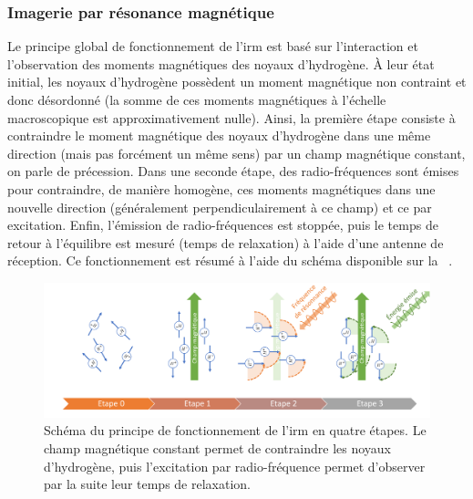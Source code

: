 \subsubsection{Imagerie par résonance magnétique}
Le principe global de fonctionnement de l'\gls{irm} est basé sur l'interaction et l'observation des moments magnétiques des noyaux d'hydrogène. À leur état initial, les noyaux d'hydrogène possèdent un moment magnétique non contraint et donc désordonné (la somme de ces moments magnétiques à l'échelle macroscopique est approximativement nulle). Ainsi, la première étape consiste à contraindre le moment magnétique des noyaux d'hydrogène dans une même direction (mais pas forcément un même sens) par un champ magnétique constant, on parle de précession. Dans une seconde étape, des radio-fréquences sont émises pour contraindre, de manière homogène, ces moments magnétiques dans une nouvelle direction (généralement perpendiculairement à ce champ) et ce par excitation. Enfin, l'émission de radio-fréquences est stoppée, puis le temps de retour à l'équilibre est mesuré (temps de relaxation) à l'aide d'une antenne de réception. Ce fonctionnement est résumé à l'aide du schéma disponible sur la ~.\par

\begin{figure}[H]
    \centering
    \includegraphics[width=\linewidth]{contents/chapter_2/resources/scheme_principle_mri.pdf}
    \caption{Schéma du principe de fonctionnement de l'\gls{irm} en quatre étapes. Le champ magnétique constant permet de contraindre les noyaux d'hydrogène, puis l'excitation par radio-fréquence permet d'observer par la suite leur temps de relaxation.}
    \label{fig:scheme_principle_mri}
\end{figure}\par

